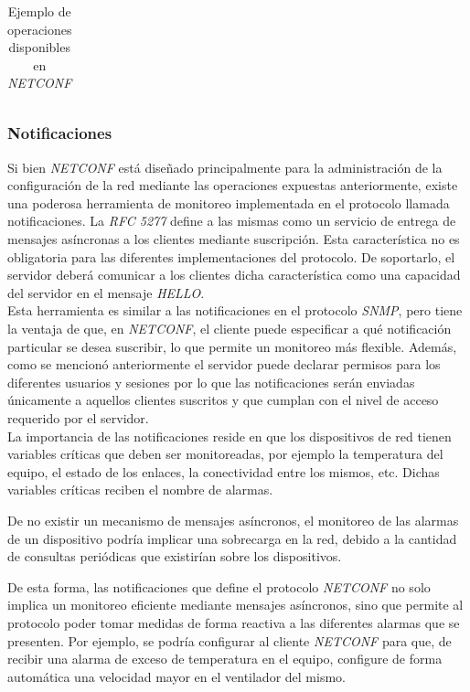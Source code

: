 \begin{table}[H]
\begin{tabular}{|c|c|c|}
	\end{tabular}
	\caption{Ejemplo de operaciones disponibles en \textit{NETCONF}}
	\label{Tab:netconf_operaciones}
	\end{table}


  \subsubsection{Notificaciones}

  Si bien \textit{NETCONF} está diseñado principalmente para la administración de la configuración de la red mediante las operaciones expuestas anteriormente, existe una poderosa herramienta de monitoreo implementada en el protocolo llamada notificaciones. La \textit{RFC 5277} define a las mismas como un servicio de entrega de mensajes asíncronas a los clientes mediante suscripción. Esta característica no es obligatoria para las diferentes implementaciones del protocolo. De soportarlo, el servidor deberá comunicar a los clientes dicha característica como una capacidad del servidor en el mensaje \textit{HELLO}.
  \\

  Esta herramienta es similar a las notificaciones en el protocolo \textit{SNMP}, pero tiene la ventaja de que, en \textit{NETCONF}, el cliente puede especificar a qué notificación particular se desea suscribir, lo que permite un monitoreo más flexible. Además, como se mencionó anteriormente el servidor puede declarar permisos para los diferentes usuarios y sesiones por lo que las notificaciones serán enviadas únicamente a aquellos clientes suscritos y que cumplan con el nivel de acceso requerido por el servidor.
  \\

  La importancia de las notificaciones reside en que los dispositivos de red tienen variables críticas que deben ser monitoreadas, por ejemplo la temperatura del equipo, el estado de los enlaces, la conectividad entre los mismos, etc. Dichas variables críticas reciben el nombre de alarmas. 
  
  De no existir un mecanismo de mensajes asíncronos, el monitoreo de las alarmas de un dispositivo podría implicar una sobrecarga en la red, debido a la cantidad de consultas periódicas que existirían sobre los dispositivos. 


  De esta forma, las notificaciones que define el protocolo \textit{NETCONF} no solo implica un monitoreo eficiente mediante mensajes asíncronos, sino que permite al protocolo poder tomar medidas de forma reactiva a las diferentes alarmas que se presenten. Por ejemplo, se podría configurar al cliente \textit{NETCONF} para que, de recibir una alarma de exceso de temperatura en el equipo, configure de forma automática una velocidad mayor en el ventilador del mismo. 
  \\

